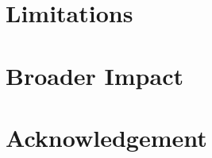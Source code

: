 \documentclass[11pt,a4paper]{article}
\begin{document}
\begin{CJK*}{UTF8}{gbsn}



\section*{Limitations}




\section*{Broader Impact}



\section*{Acknowledgement}






\clearpage


% 
\end{CJK*}
\end{document}
